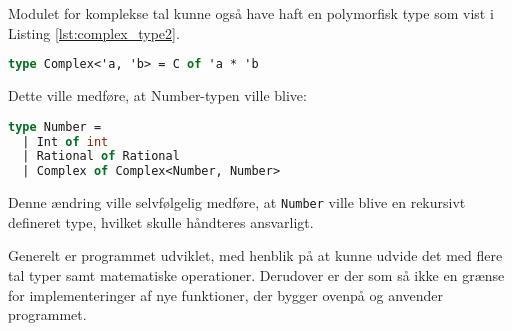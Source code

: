 Modulet for komplekse tal kunne også have haft en polymorfisk type som vist i Listing \ref{lst:complex_type2}.

\begin{lstlisting}[language={FSharp}, label={lst:complex_type2}, caption={Eksempel på alternative typer for komplekse tal modulet}]
type Complex<'a, 'b> = C of 'a * 'b
\end{lstlisting}

Dette ville medføre, at Number-typen ville blive:

\begin{lstlisting}[language={FSharp}, label={lst:number_type2}, caption={Eksempel på alternative typer for Number-typen}]
type Number = 
  | Int of int 
  | Rational of Rational 
  | Complex of Complex<Number, Number>
\end{lstlisting}

Denne ændring ville selvfølgelig medføre, at \texttt{Number} ville blive en rekursivt defineret type, hvilket skulle håndteres ansvarligt.

Generelt er programmet udviklet, med henblik på at kunne udvide det med flere tal typer samt matematiske operationer. Derudover er der som så ikke en grænse for implementeringer af nye funktioner, der bygger ovenpå og anvender programmet.


